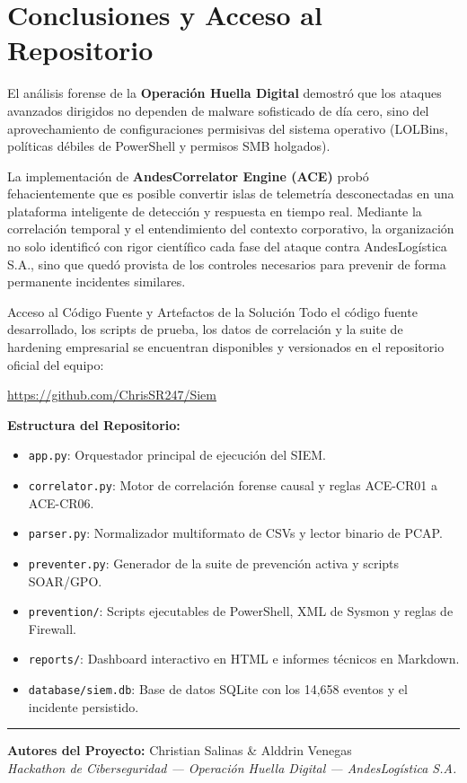\documentclass[11pt,a4paper]{article}
\begin{document}
\section{Conclusiones y Acceso al Repositorio}

El análisis forense de la \textbf{Operación Huella Digital} demostró que los ataques avanzados dirigidos no dependen de malware sofisticado de día cero, sino del aprovechamiento de configuraciones permisivas del sistema operativo (LOLBins, políticas débiles de PowerShell y permisos SMB holgados).

La implementación de \textbf{AndesCorrelator Engine (ACE)} probó fehacientemente que es posible convertir islas de telemetría desconectadas en una plataforma inteligente de detección y respuesta en tiempo real. Mediante la correlación temporal y el entendimiento del contexto corporativo, la organización no solo identificó con rigor científico cada fase del ataque contra AndesLogística S.A., sino que quedó provista de los controles necesarios para prevenir de forma permanente incidentes similares.

\vspace{0.3cm}
\begin{cajaExito}{Acceso al Código Fuente y Artefactos de la Solución}
    Todo el código fuente desarrollado, los scripts de prueba, los datos de correlación y la suite de hardening empresarial se encuentran disponibles y versionados en el repositorio oficial del equipo:
    \begin{center}
        \url{https://github.com/ChrisSR247/Siem}
    \end{center}
    \textbf{Estructura del Repositorio:}
    \begin{itemize}[noitemsep]
        \item \texttt{app.py}: Orquestador principal de ejecución del SIEM.
        \item \texttt{correlator.py}: Motor de correlación forense causal y reglas ACE-CR01 a ACE-CR06.
        \item \texttt{parser.py}: Normalizador multiformato de CSVs y lector binario de PCAP.
        \item \texttt{preventer.py}: Generador de la suite de prevención activa y scripts SOAR/GPO.
        \item \texttt{prevention/}: Scripts ejecutables de PowerShell, XML de Sysmon y reglas de Firewall.
        \item \texttt{reports/}: Dashboard interactivo en HTML e informes técnicos en Markdown.
        \item \texttt{database/siem.db}: Base de datos SQLite con los 14,658 eventos y el incidente persistido.
    \end{itemize}
\end{cajaExito}

\vspace{0.5cm}
\noindent\rule{\textwidth}{0.8pt}
\begin{center}
    \small \textbf{Autores del Proyecto:} Christian Salinas \& Alddrin Venegas\\
    \textit{Hackathon de Ciberseguridad — Operación Huella Digital — AndesLogística S.A.}
\end{center}
\end{document}
